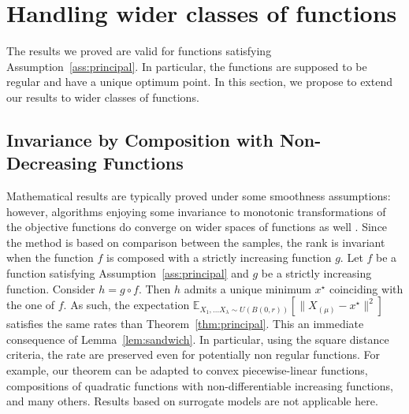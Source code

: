 \section{Handling wider classes of functions}
\label{sec:wider}
The results we proved are valid for functions satisfying Assumption~\ref{ass:principal}. In particular, the functions are supposed to be regular and have a unique optimum point. In this section, we propose to extend our results to wider classes of functions.

\subsection{Invariance by Composition with Non-Decreasing Functions}\label{invar}

{Mathematical results are typically proved under some smoothness assumptions: however, algorithms enjoying some invariance to monotonic transformations of the objective functions do converge on wider spaces of functions as well \cite{monoto}.}
Since the method is based on comparison between the samples, the rank is invariant when the function $f$ is composed with a strictly increasing function $g$. Let $f$ be a function satisfying Assumption~\ref{ass:principal} and $g$ be a strictly increasing function. Consider $h=g\circ f$. Then $h$ admits a unique minimum $x^\star$ coinciding with the one of $f$. As such, the expectation  $\mathbb{E}_{X_{1},...X_{\lambda}\sim U(B(0,r))}\left[\lVert X_{(\mu)}-x^\star\rVert^2\right]$ satisfies the same rates than Theorem~\ref{thm:principal}.
This an immediate consequence of Lemma~\ref{lem:sandwich}. In particular, using the square distance criteria, the rate are preserved even for potentially non regular functions. 
{For example, our theorem can be adapted to convex piecewise-linear functions, compositions of quadratic functions with non-differentiable increasing functions, and many others.}
Results based on surrogate models  are not applicable here. 


